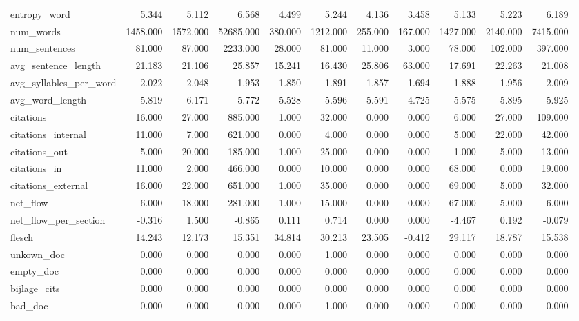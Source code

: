 \begin{tabular}{lrrrrrrrrrr}
\cline{1-11}
entropy\_word & 5.344 & 5.112 & 6.568 & 4.499 & 5.244 & 4.136 & 3.458 & 5.133 & 5.223 & 6.189 \\
\cline{1-11}
num\_words & 1458.000 & 1572.000 & 52685.000 & 380.000 & 1212.000 & 255.000 & 167.000 & 1427.000 & 2140.000 & 7415.000 \\
\cline{1-11}
num\_sentences & 81.000 & 87.000 & 2233.000 & 28.000 & 81.000 & 11.000 & 3.000 & 78.000 & 102.000 & 397.000 \\
\cline{1-11}
avg\_sentence\_length & 21.183 & 21.106 & 25.857 & 15.241 & 16.430 & 25.806 & 63.000 & 17.691 & 22.263 & 21.008 \\
\cline{1-11}
avg\_syllables\_per\_word & 2.022 & 2.048 & 1.953 & 1.850 & 1.891 & 1.857 & 1.694 & 1.888 & 1.956 & 2.009 \\
\cline{1-11}
avg\_word\_length & 5.819 & 6.171 & 5.772 & 5.528 & 5.596 & 5.591 & 4.725 & 5.575 & 5.895 & 5.925 \\
\cline{1-11}
citations & 16.000 & 27.000 & 885.000 & 1.000 & 32.000 & 0.000 & 0.000 & 6.000 & 27.000 & 109.000 \\
\cline{1-11}
citations\_internal & 11.000 & 7.000 & 621.000 & 0.000 & 4.000 & 0.000 & 0.000 & 5.000 & 22.000 & 42.000 \\
\cline{1-11}
citations\_out & 5.000 & 20.000 & 185.000 & 1.000 & 25.000 & 0.000 & 0.000 & 1.000 & 5.000 & 13.000 \\
\cline{1-11}
citations\_in & 11.000 & 2.000 & 466.000 & 0.000 & 10.000 & 0.000 & 0.000 & 68.000 & 0.000 & 19.000 \\
\cline{1-11}
citations\_external & 16.000 & 22.000 & 651.000 & 1.000 & 35.000 & 0.000 & 0.000 & 69.000 & 5.000 & 32.000 \\
\cline{1-11}
net\_flow & -6.000 & 18.000 & -281.000 & 1.000 & 15.000 & 0.000 & 0.000 & -67.000 & 5.000 & -6.000 \\
\cline{1-11}
net\_flow\_per\_section & -0.316 & 1.500 & -0.865 & 0.111 & 0.714 & 0.000 & 0.000 & -4.467 & 0.192 & -0.079 \\
\cline{1-11}
flesch & 14.243 & 12.173 & 15.351 & 34.814 & 30.213 & 23.505 & -0.412 & 29.117 & 18.787 & 15.538 \\
\cline{1-11}
unkown\_doc & 0.000 & 0.000 & 0.000 & 0.000 & 1.000 & 0.000 & 0.000 & 0.000 & 0.000 & 0.000 \\
\cline{1-11}
empty\_doc & 0.000 & 0.000 & 0.000 & 0.000 & 0.000 & 0.000 & 0.000 & 0.000 & 0.000 & 0.000 \\
\cline{1-11}
bijlage\_cits & 0.000 & 0.000 & 0.000 & 0.000 & 0.000 & 0.000 & 0.000 & 0.000 & 0.000 & 0.000 \\
\cline{1-11}
bad\_doc & 0.000 & 0.000 & 0.000 & 0.000 & 1.000 & 0.000 & 0.000 & 0.000 & 0.000 & 0.000 \\
\cline{1-11}
\bottomrule
\end{tabular}
